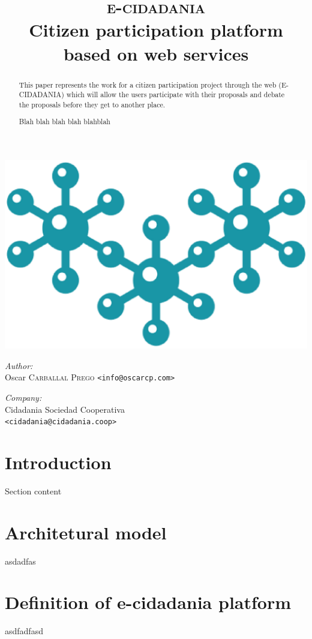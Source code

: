 \documentclass[pdflatex, a4paper, 10pt]{article}
\begin{document}
\begin{center}
\includegraphics[scale=0.3]{logo_cidadania_2.eps}
\end{center}
\title{\Huge\textsc{e-cidadania}\\
       \Large Citizen participation platform based on web services}
\maketitle
\begin{minipage}{0.4\textwidth}
\begin{flushleft}
\emph{Author:}\\
Oscar \textsc{Carballal Prego} \texttt{<info@oscarcp.com>}
\end{flushleft}
\end{minipage}
\begin{minipage}{0.5\textwidth}
\begin{flushright}
\emph{Company:}\\
Cidadania Sociedad Cooperativa\\
\texttt{<cidadania@cidadania.coop>}
\end{flushright}
\end{minipage}

\newpage 

\begin{abstract}
This paper represents the work for a citizen participation project through the web (E-CIDADANIA) which will allow the users participate with their proposals and debate the proposals before they get to another place.

Blah blah blah blah blahblah
\end{abstract}
\newpage

\tableofcontents
\newpage

\section{Introduction}
Section content

\section{Architetural model}
asdadfas

\section{Definition of e-cidadania platform}
asdfadfasd
\end{document}
